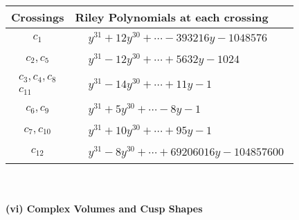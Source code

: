 \documentclass[1p]{elsarticle_modified}
\theoremstyle{definition}
\begin{document}
\begin{tabular}{m{50pt}|m{274pt}}
Crossings & \hspace{64pt}Riley Polynomials at each crossing \\
\hline $$\begin{aligned}c_{1}\end{aligned}$$&$\begin{aligned}
&y^{31}+12 y^{30}+\cdots-393216 y-1048576
\end{aligned}$\\
\hline $$\begin{aligned}c_{2},c_{5}\end{aligned}$$&$\begin{aligned}
&y^{31}-12 y^{30}+\cdots+5632 y-1024
\end{aligned}$\\
\hline $$\begin{aligned}c_{3},c_{4},c_{8}\\c_{11}\end{aligned}$$&$\begin{aligned}
&y^{31}-14 y^{30}+\cdots+11 y-1
\end{aligned}$\\
\hline $$\begin{aligned}c_{6},c_{9}\end{aligned}$$&$\begin{aligned}
&y^{31}+5 y^{30}+\cdots-8 y-1
\end{aligned}$\\
\hline $$\begin{aligned}c_{7},c_{10}\end{aligned}$$&$\begin{aligned}
&y^{31}+10 y^{30}+\cdots+95 y-1
\end{aligned}$\\
\hline $$\begin{aligned}c_{12}\end{aligned}$$&$\begin{aligned}
&y^{31}-8 y^{30}+\cdots+69206016 y-104857600
\end{aligned}$\\
\hline
\end{tabular}\\~\\
\newpage\flushleft \textbf{(vi) Complex Volumes and Cusp Shapes}
\end{document}
